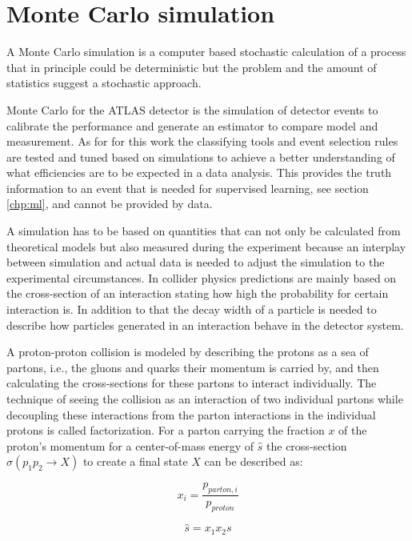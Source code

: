 \section{Monte Carlo simulation}

A Monte Carlo simulation is a computer based stochastic calculation of a process that in principle could be deterministic but the problem and the amount of statistics suggest a stochastic approach.

Monte Carlo for the ATLAS detector is the simulation of detector events to calibrate the performance and generate an estimator to compare model and measurement. As for for this work the classifying tools and event selection rules are tested and tuned based on simulations to achieve a better understanding of what efficiencies are to be expected in a data analysis. This provides the truth information to an event that is needed for supervised learning, see section \ref{chp:ml}, and cannot be provided by data.

A simulation has to be based on quantities that can not only be calculated from theoretical models but also measured during the experiment because an interplay between simulation and actual data is needed to adjust the simulation to the experimental circumstances. In collider physics predictions are mainly based on  the cross-section of an interaction stating how high the probability for certain interaction is. In addition to that the decay width of a particle is needed to describe how particles generated in an interaction behave in the detector system.

A proton-proton collision is modeled by describing the protons as a sea of partons, {i.e.}, the gluons and quarks their momentum is carried by, and then calculating the cross-sections for these partons to interact individually. The technique of seeing the collision as an interaction of two individual partons while decoupling these interactions from the parton interactions in the individual protons is called factorization.
For a parton carrying the fraction $x$ of the proton's momentum for a center-of-mass energy of $\hat{s}$  the cross-section $\sigma(p_1 p_2 \rightarrow X)$ to create a final state $X$ can be described as:


\noindent\begin{minipage}{.5\linewidth}
\begin{equation}
	x_i = \frac{p_{parton,i}}{p_{proton}} 
\end{equation}
\end{minipage}%
\begin{minipage}{.5\linewidth}
\begin{equation}
	\hat{s} = x_1 x_2 s
\end{equation}
\end{minipage}

